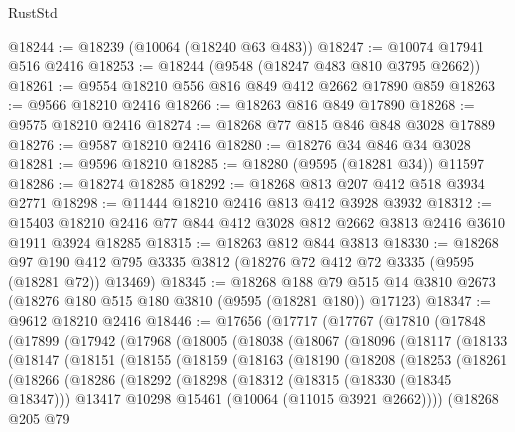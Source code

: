 \begin{lexlean}{RustStd}
\begin{coremodule}
@18244 := @18239 (@10064 (@18240 @63 @483))
@18247 := @10074 @17941 @516 @2416
@18253 := @18244 (@9548 (@18247 @483 @810 @3795 @2662))
@18261 := @9554 @18210 @556 @816 @849 @412 @2662 @17890 @859
@18263 := @9566 @18210 @2416
@18266 := @18263 @816 @849 @17890
@18268 := @9575 @18210 @2416
@18274 := @18268 @77 @815 @846 @848 @3028 @17889
@18276 := @9587 @18210 @2416
@18280 := @18276 @34 @846 @34 @3028
@18281 := @9596 @18210
@18285 := @18280 (@9595 (@18281 @34)) @11597
@18286 := @18274 @18285
@18292 := @18268 @813 @207 @412 @518 @3934 @2771
@18298 := @11444 @18210 @2416 @813 @412 @3928 @3932
@18312 := @15403 @18210 @2416 @77 @844 @412 @3028 @812 @2662 @3813 @2416 @3610 @1911 @3924 @18285
@18315 := @18263 @812 @844 @3813
@18330 := @18268
    @97
    @190
    @412
    @795
    @3335
    @3812
    (@18276 @72 @412 @72 @3335 (@9595 (@18281 @72)) @13469)
@18345 := @18268
    @188
    @79
    @515
    @14
    @3810
    @2673
    (@18276 @180 @515 @180 @3810 (@9595 (@18281 @180)) @17123)
@18347 := @9612 @18210 @2416
@18446 := @17656
    (@17717
      (@17767
        (@17810
          (@17848
            (@17899
              (@17942
                (@17968
                  (@18005
                    (@18038
                      (@18067
                        (@18096
                          (@18117
                            (@18133
                              (@18147
                                (@18151
                                  (@18155
                                    (@18159
                                      (@18163
                                        (@18190
                                          (@18208
                                            (@18253
                                              (@18261
                                                (@18266
                                                  (@18286
                                                    (@18292
                                                      (@18298
                                                        (@18312
                                                          (@18315 (@18330 (@18345 @18347)))
                                                          @13417
                                                          @10298
                                                          @15461
                                                          (@10064 (@11015 @3921 @2662))))
                                                      (@18268
                                                        @205
                                                        @79

\end{coremodule}
\end{lexlean}
